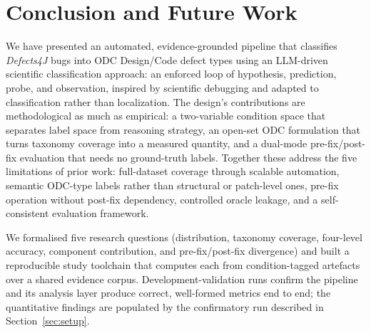 \section{Conclusion and Future Work}
\label{sec:conclusion}

We have presented an automated, evidence-grounded pipeline that classifies
\textit{Defects4J} bugs into ODC Design/Code defect types using an LLM-driven
scientific classification approach: an enforced loop of hypothesis,
prediction, probe, and observation, inspired by scientific debugging and
adapted to classification rather than localization. The design's contributions are methodological as much
as empirical: a two-variable condition space that separates label space from
reasoning strategy, an open-set ODC formulation that turns taxonomy coverage into
a measured quantity, and a dual-mode pre-fix/post-fix evaluation that needs no
ground-truth labels. Together these address the five limitations of prior work:
full-dataset coverage through scalable automation, semantic ODC-type labels
rather than structural or patch-level ones, pre-fix operation without post-fix
dependency, controlled oracle leakage, and a self-consistent evaluation
framework.

We formalised five research questions (distribution, taxonomy coverage,
four-level accuracy, component contribution, and pre-fix/post-fix divergence)
and built a reproducible study toolchain that computes each from condition-tagged
artefacts over a shared evidence corpus. Development-validation runs confirm the
pipeline and its analysis layer produce correct, well-formed metrics end to end;
the quantitative findings are populated by the confirmatory run described in
Section~\ref{sec:setup}.

